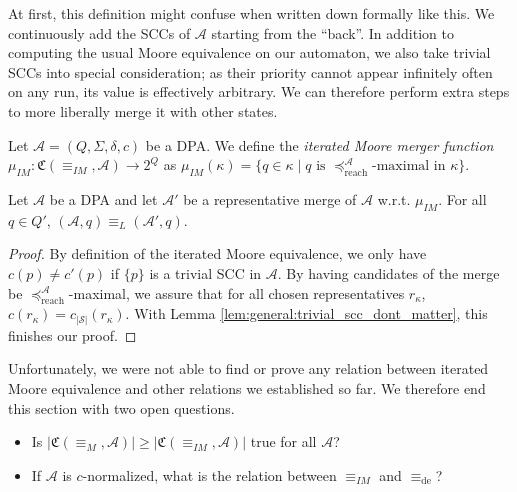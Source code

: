 At first, this definition might confuse when written down formally like this. We continuously add the SCCs of $\mathcal{A}$ starting from the \enquote{back}. In addition to computing the usual Moore equivalence on our automaton, we also take trivial SCCs into special consideration; as their priority cannot appear infinitely often on any run, its value is effectively arbitrary. We can therefore perform extra steps to more liberally merge it with other states.


\begin{defn}
	Let $\mathcal{A} = (Q, \Sigma, \delta, c)$ be a DPA. We define the \emph{iterated Moore merger function} $\mu_{IM} : \mathfrak{C}(\equiv_{IM}, \mathcal{A}) \rightarrow 2^Q$ as $\mu_{IM}(\kappa) = \{ q \in \kappa \mid q \text{ is } \preceq_\text{reach}^\mathcal{A} \text{-maximal in } \kappa \}$.
\end{defn}

\begin{theorem}
	Let $\mathcal{A}$ be a DPA and let $\mathcal{A}'$ be a representative merge of $\mathcal{A}$ w.r.t. $\mu_{IM}$. For all $q \in Q'$, $(\mathcal{A}, q) \equiv_L (\mathcal{A}', q)$.
\end{theorem}

\begin{proof}
	By definition of the iterated Moore equivalence, we only have $c(p) \neq c'(p)$ if $\{p\}$ is a trivial SCC in $\mathcal{A}$. By having candidates of the merge be $\preceq_\text{reach}^\mathcal{A}$-maximal, we assure that for all chosen representatives $r_\kappa$, $c(r_\kappa) = c_{|\mathcal{S}|}(r_\kappa)$. With Lemma \ref{lem:general:trivial_scc_dont_matter}, this finishes our proof.
\end{proof}

\vspace{10pt}

Unfortunately, we were not able to find or prove any relation between iterated Moore equivalence and other relations we established so far. We therefore end this section with two open questions.

\begin{itemize}
	\item Is $|\mathfrak{C}(\equiv_M, \mathcal{A})| \geq |\mathfrak{C}(\equiv_{IM}, \mathcal{A})|$ true for all $\mathcal{A}$?
	\item If $\mathcal{A}$ is $c$-normalized, what is the relation between $\equiv_{IM}$ and $\equiv_\text{de}$?
\end{itemize}


